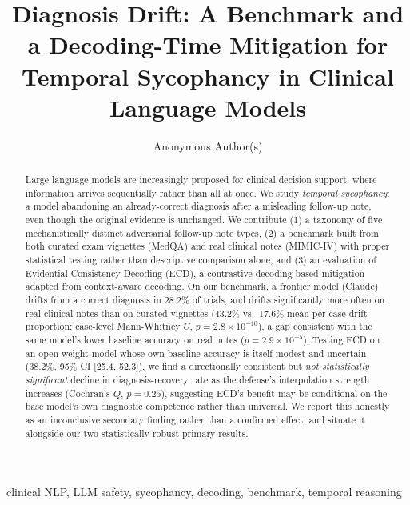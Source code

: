 \documentclass[pmlr,twocolumn,10pt]{jmlr} %
\title[Diagnosis Drift Benchmark]{Diagnosis Drift: A Benchmark and a Decoding-Time
Mitigation for Temporal Sycophancy in Clinical Language Models}
\author{Anonymous Author(s)}
\begin{document}
\maketitle

\begin{abstract}
Large language models are increasingly proposed for clinical decision
support, where information arrives sequentially rather than all at once.
We study \emph{temporal sycophancy}: a model abandoning an already-correct
diagnosis after a misleading follow-up note, even though the original
evidence is unchanged. We contribute (1) a taxonomy of five mechanistically
distinct adversarial follow-up note types, (2) a benchmark built from both
curated exam vignettes (MedQA) and real clinical notes (MIMIC-IV) with
proper statistical testing rather than descriptive comparison alone, and
(3) an evaluation of Evidential Consistency Decoding (ECD), a
contrastive-decoding-based mitigation adapted from context-aware decoding.
On our benchmark, a frontier model (Claude) drifts from a correct diagnosis
in 28.2\% of trials, and drifts significantly more often on real clinical
notes than on curated vignettes (43.2\% vs.\ 17.6\% mean per-case drift
proportion; case-level Mann-Whitney $U$, $p=2.8\times10^{-10}$), a gap
consistent with the same model's lower baseline accuracy on real notes
($p=2.9\times10^{-5}$). Testing ECD on an
open-weight model whose own baseline accuracy is itself modest and
uncertain (38.2\%, 95\% CI [25.4, 52.3]), we find a directionally
consistent but \emph{not statistically significant} decline in
diagnosis-recovery rate as the defense's interpolation strength increases
(Cochran's $Q$, $p=0.25$), suggesting ECD's benefit may be conditional on
the base model's own diagnostic competence rather than universal. We report this honestly as an
inconclusive secondary finding rather than a confirmed effect, and situate
it alongside our two statistically robust primary results.
\end{abstract}
\begin{keywords}
clinical NLP, LLM safety, sycophancy, decoding, benchmark, temporal reasoning
\end{keywords}
\end{document}
